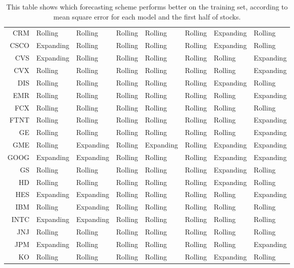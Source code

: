 \begin{table}[ht]
\begin{tabular}{rlllllll}
  CRM & Rolling & Rolling & Rolling & Rolling & Rolling & Expanding & Rolling \\ 
  CSCO & Expanding & Rolling & Rolling & Rolling & Rolling & Expanding & Rolling \\ 
  CVS & Expanding & Rolling & Rolling & Rolling & Rolling & Rolling & Expanding \\ 
  CVX & Rolling & Rolling & Rolling & Rolling & Rolling & Rolling & Expanding \\ 
  DIS & Rolling & Rolling & Rolling & Rolling & Rolling & Expanding & Rolling \\ 
  EMR & Rolling & Rolling & Rolling & Rolling & Rolling & Rolling & Expanding \\ 
  FCX & Rolling & Rolling & Rolling & Rolling & Rolling & Rolling & Rolling \\ 
  FTNT & Rolling & Rolling & Rolling & Rolling & Rolling & Rolling & Expanding \\ 
  GE & Rolling & Rolling & Rolling & Rolling & Rolling & Rolling & Expanding \\ 
  GME & Rolling & Expanding & Rolling & Expanding & Rolling & Expanding & Expanding \\ 
  GOOG & Expanding & Expanding & Rolling & Rolling & Rolling & Expanding & Expanding \\ 
  GS & Rolling & Rolling & Rolling & Rolling & Rolling & Expanding & Rolling \\ 
  HD & Rolling & Rolling & Rolling & Rolling & Rolling & Expanding & Rolling \\ 
  HES & Expanding & Expanding & Rolling & Rolling & Rolling & Rolling & Expanding \\ 
  IBM & Rolling & Expanding & Rolling & Rolling & Rolling & Rolling & Rolling \\ 
  INTC & Expanding & Expanding & Rolling & Rolling & Rolling & Rolling & Rolling \\ 
  JNJ & Rolling & Rolling & Rolling & Rolling & Rolling & Rolling & Rolling \\ 
  JPM & Expanding & Rolling & Rolling & Rolling & Rolling & Rolling & Expanding \\ 
  KO & Rolling & Rolling & Rolling & Rolling & Rolling & Expanding & Rolling \\ 
   \hline
\end{tabular}
\caption[Better scheme MSE (1)]{This table shows which forecasting scheme performs better on the training set, according to mean square error 
              for each model and the first half of stocks.} 
\label{Table:Better_MSE_1}
\end{table}
